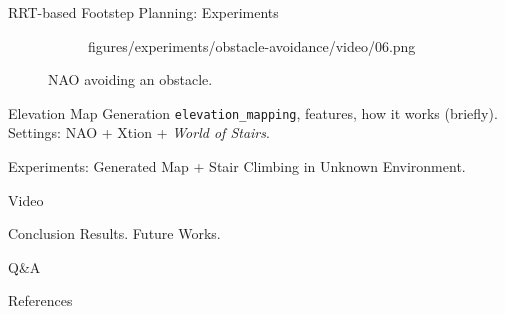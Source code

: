 \documentclass[10pt]{beamer}
\begin{document}
\begin{frame}{RRT-based Footstep Planning: Experiments}
\begin{figure}
\begin{subfigure}{0.40\textwidth}
				{figures/experiments/obstacle-avoidance/video/06.png}
		\end{subfigure}
		\caption{NAO avoiding an obstacle.}
	\end{figure}
\end{frame}

\begin{frame}{Elevation Map Generation}
  \texttt{elevation\_mapping}, features, how it works (briefly).
  Settings: NAO + Xtion + \textit{World of Stairs}.

  Experiments: Generated Map + Stair Climbing in Unknown Environment.
\end{frame}

\begin{frame}[standout]
  Video
\end{frame}

\begin{frame}{Conclusion}
  Results. Future Works.
\end{frame}

\begin{frame}[standout]
    Q\&A
\end{frame}

\appendix

\begin{frame}{References}
  
  
\end{frame}
\end{document}
